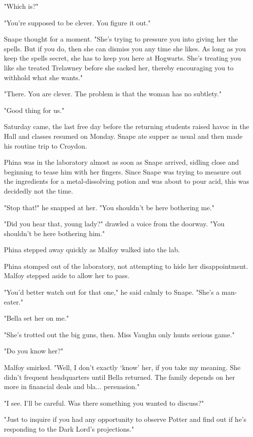 \documentclass[a4paper,11pt]{article}
\begin{document}
"Which is?"

"You're supposed to be clever. You figure it out."

Snape thought for a moment. "She's trying to pressure you into giving her the spells. But if you do, then she can dismiss you any time she likes. As long as you keep the spells secret, she has to keep you here at Hogwarts. She's treating you like she treated Trelawney before she sacked her, thereby encouraging you to withhold what she wants."

"There. You are clever. The problem is that the woman has no subtlety."

"Good thing for us."

Saturday came, the last free day before the returning students raised havoc in the Hall and classes resumed on Monday. Snape ate supper as usual and then made his routine trip to Croydon.

Phina was in the laboratory almost as soon as Snape arrived, sidling close and beginning to tease him with her fingers. Since Snape was trying to measure out the ingredients for a metal-dissolving potion and was about to pour acid, this was decidedly not the time.

"Stop that!" he snapped at her. "You shouldn't be here bothering me."

"Did you hear that, young lady?" drawled a voice from the doorway. "You shouldn't be here bothering him."

Phina stepped away quickly as Malfoy walked into the lab.

Phina stomped out of the laboratory, not attempting to hide her disappointment. Malfoy stepped aside to allow her to pass.

"You'd better watch out for that one," he said calmly to Snape. "She's a man-eater."

"Bella set her on me."

"She's trotted out the big guns, then. Miss Vaughn only hunts serious game."

"Do you know her?"

Malfoy smirked. "Well, I don't exactly `know' her, if you take my meaning. She didn't frequent headquarters until Bella returned. The family depends on her more in financial deals and bla... persuasion."

"I see. I'll be careful. Was there something you wanted to discuss?"

"Just to inquire if you had any opportunity to observe Potter and find out if he's responding to the Dark Lord's projections."
\end{document}
